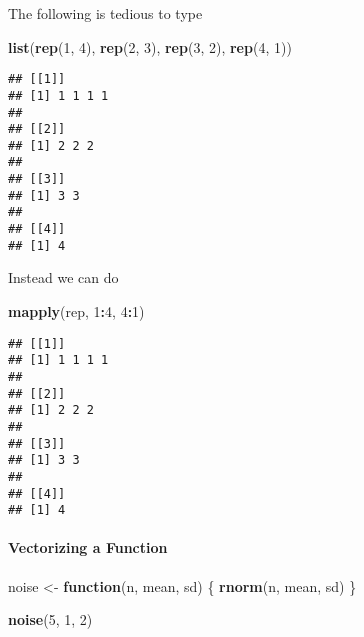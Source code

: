 \documentclass[
]{article}
\newenvironment{Shaded}{\begin{snugshade}}{\end{snugshade}}
\newcommand{\ControlFlowTok}[1]{\textcolor[rgb]{0.13,0.29,0.53}{\textbf{#1}}}
\newcommand{\DecValTok}[1]{\textcolor[rgb]{0.00,0.00,0.81}{#1}}
\newcommand{\KeywordTok}[1]{\textcolor[rgb]{0.13,0.29,0.53}{\textbf{#1}}}
\newcommand{\NormalTok}[1]{#1}
\newcommand{\OperatorTok}[1]{\textcolor[rgb]{0.81,0.36,0.00}{\textbf{#1}}}
\newcommand{\StringTok}[1]{\textcolor[rgb]{0.31,0.60,0.02}{#1}}
\begin{document}
The following is tedious to type

\begin{Shaded}
\begin{Highlighting}[]
\KeywordTok{list}\NormalTok{(}\KeywordTok{rep}\NormalTok{(}\DecValTok{1}\NormalTok{, }\DecValTok{4}\NormalTok{), }\KeywordTok{rep}\NormalTok{(}\DecValTok{2}\NormalTok{, }\DecValTok{3}\NormalTok{), }\KeywordTok{rep}\NormalTok{(}\DecValTok{3}\NormalTok{, }\DecValTok{2}\NormalTok{), }\KeywordTok{rep}\NormalTok{(}\DecValTok{4}\NormalTok{, }\DecValTok{1}\NormalTok{))}
\end{Highlighting}
\end{Shaded}

\begin{verbatim}
## [[1]]
## [1] 1 1 1 1
## 
## [[2]]
## [1] 2 2 2
## 
## [[3]]
## [1] 3 3
## 
## [[4]]
## [1] 4
\end{verbatim}

Instead we can do

\begin{Shaded}
\begin{Highlighting}[]
\KeywordTok{mapply}\NormalTok{(rep, }\DecValTok{1}\OperatorTok{:}\DecValTok{4}\NormalTok{, }\DecValTok{4}\OperatorTok{:}\DecValTok{1}\NormalTok{)}
\end{Highlighting}
\end{Shaded}

\begin{verbatim}
## [[1]]
## [1] 1 1 1 1
## 
## [[2]]
## [1] 2 2 2
## 
## [[3]]
## [1] 3 3
## 
## [[4]]
## [1] 4
\end{verbatim}

\hypertarget{vectorizing-a-function}{%
\paragraph{Vectorizing a Function}\label{vectorizing-a-function}}

\begin{Shaded}
\begin{Highlighting}[]
\NormalTok{noise \textless{}{-}}\StringTok{ }\ControlFlowTok{function}\NormalTok{(n, mean, sd) \{}
    \KeywordTok{rnorm}\NormalTok{(n, mean, sd)}
\NormalTok{\}}
\end{Highlighting}
\end{Shaded}

\begin{Shaded}
\begin{Highlighting}[]
\KeywordTok{noise}\NormalTok{(}\DecValTok{5}\NormalTok{, }\DecValTok{1}\NormalTok{, }\DecValTok{2}\NormalTok{)}
\end{Highlighting}
\end{Shaded}
\end{document}
